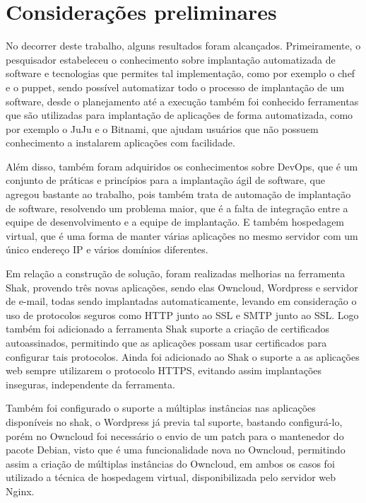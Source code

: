 \chapter{Considerações preliminares}
\label{cap-conclusoes}

No decorrer deste trabalho, alguns resultados foram alcançados. Primeiramente, o
pesquisador estabeleceu o conhecimento sobre implantação automatizada
de software e tecnologias que permites tal implementação, como por exemplo o chef
e o puppet, sendo possível automatizar todo o processo de implantação de um software,
desde o planejamento até a execução também foi conhecido ferramentas que são
utilizadas para implantação de aplicações de forma automatizada, como por exemplo
o JuJu e o Bitnami, que ajudam usuários que não possuem conhecimento a
instalarem aplicações com facilidade.

Além disso, também foram adquiridos os conhecimentos sobre DevOps, que é um conjunto
de práticas e princípios para a implantação ágil de software, que agregou bastante
ao trabalho, pois também trata de automação de implantação de software, resolvendo
um problema maior, que é a falta de integração entre a equipe de desenvolvimento
e a equipe de implantação. E também hospedagem virtual, que é uma forma de manter
várias aplicações no mesmo servidor com um único endereço IP e vários domínios diferentes.

Em relação a construção de solução, foram realizadas melhorias na ferramenta Shak,
provendo três novas aplicações, sendo elas Owncloud, Wordpress e servidor de e-mail,
todas sendo implantadas automaticamente, levando em consideração o uso de protocolos
seguros como HTTP junto ao SSL e SMTP junto ao SSL. Logo também foi adicionado a
ferramenta Shak suporte a criação de certificados autoassinados, permitindo que
as aplicações possam usar certificados para configurar tais protocolos. Ainda foi
adicionado ao Shak o suporte a as aplicações web sempre utilizarem
o protocolo HTTPS, evitando assim implantações inseguras, independente da ferramenta.

Também foi configurado o suporte a múltiplas instâncias nas aplicações disponíveis
no shak, o Wordpress já previa tal suporte, bastando configurá-lo, porém no Owncloud
foi necessário o envio de um patch para o mantenedor do pacote Debian, visto que
é uma funcionalidade nova no Owncloud, permitindo assim a criação de múltiplas
instâncias do Owncloud, em ambos os casos foi utilizado a técnica de hospedagem
virtual, disponibilizada pelo servidor web Nginx.

